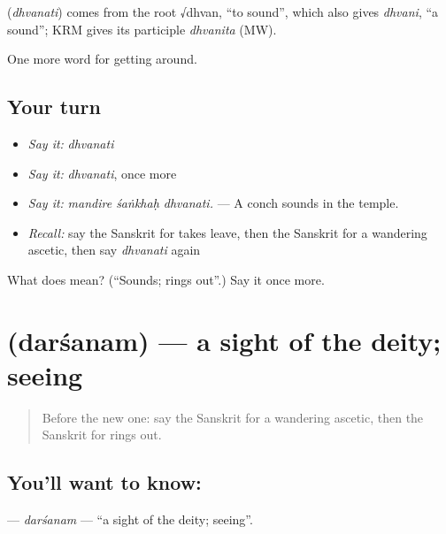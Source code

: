 \begin{cousinweb}
\textbf{} (\emph{dhvanati}) comes from the root √dhvan, \textquotedblleft{}to sound\textquotedblright{}, which also gives \emph{dhvani}, \textquotedblleft{}a sound\textquotedblright{}; KRM gives its participle \emph{dhvanita} (MW).
\end{cousinweb}

\begin{grammarlens}[title={What you've built}]
One more word for getting around.
\end{grammarlens}

\subsection*{Your turn}
\begin{itemize}
\raggedright
  \item \emph{Say it:} \emph{dhvanati}
  \item \emph{Say it:} \emph{dhvanati}, once more
  \item \emph{Say it:} \emph{mandire śaṅkhaḥ dhvanati.} — A conch sounds in the temple.
  \item \emph{Recall:} say the Sanskrit for takes leave, then the Sanskrit for a wandering ascetic, then say \emph{dhvanati} again
\end{itemize}

\begin{tcolorbox}[breakable,colback=teal!4,colframe=teal!35!black,title={Before you move on}]
What does  mean? (\textquotedblleft{}Sounds; rings out\textquotedblright{}.) Say it once more.
\end{tcolorbox}
\section[\texorpdfstring{\sk{दर्शनम्} (darśanam)}{दर्शनम् (darśanam)}]{ (darśanam) — a sight of the deity; seeing}

\label{lesson:SA-C396-darsanam}



\begin{quote}
Before the new one: say the Sanskrit for a wandering ascetic, then the Sanskrit for rings out.
\end{quote}

\subsection*{You'll want to know: }
\textbf{} — \emph{darśanam} — \textquotedblleft{}a sight of the deity; seeing\textquotedblright{}.

